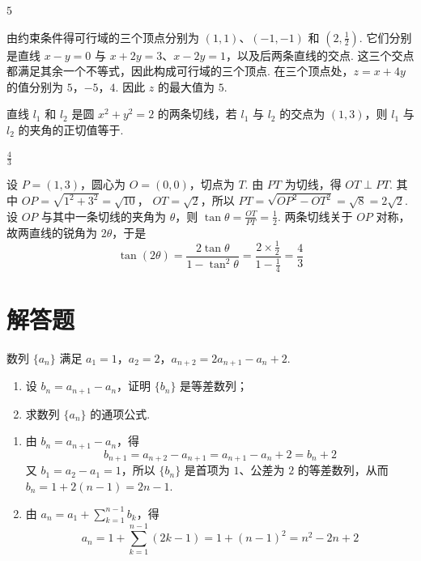 \begin{answer}
\(5\)
\end{answer}

\begin{solution}
由约束条件得可行域的三个顶点分别为 \((1,1)\)、\((-1,-1)\) 和
\(\left(2,\frac{1}{2}\right)\).
它们分别是直线 \(x-y=0\) 与 \(x+2y=3\)、\(x-2y=1\)，以及后两条直线的交点. 这三个交点都满足其余一个不等式，因此构成可行域的三个顶点.
在三个顶点处，\(z=x+4y\) 的值分别为
\(5\)，\(-5\)，\(4\). 因此 \(z\) 的最大值为 \(5\).
\end{solution}

\begin{problem}
直线 \(l_{1}\) 和 \(l_{2}\) 是圆 \(x^{2} + y^{2} = 2\) 的两条切线，若 \(l_{1}\) 与 \(l_{2}\) 的交点为 \((1,3)\)，则 \(l_{1}\) 与 \(l_{2}\) 的夹角的正切值等于\fillinblank{}.
\end{problem}

\begin{answer}
\(\frac{4}{3}\)
\end{answer}

\begin{solution}
设 \(P=(1,3)\)，圆心为 \(O=(0,0)\)，切点为 \(T\). 由 \(PT\) 为切线，得
\(OT\perp PT\). 其中 \(OP=\sqrt{1^2+3^2}=\sqrt{10}\)，
\(OT=\sqrt{2}\)，所以
\(PT=\sqrt{OP^2-OT^2}=\sqrt{8}=2\sqrt{2}\).
设 \(OP\) 与其中一条切线的夹角为 \(\theta\)，则
\(\tan\theta=\frac{OT}{PT}=\frac{1}{2}\). 两条切线关于 \(OP\) 对称，故两直线的锐角为 \(2\theta\)，于是
\[
\tan(2\theta)=\frac{2\tan\theta}{1-\tan^2\theta}
=\frac{2\times\frac12}{1-\frac14}=\frac{4}{3}
\]
\end{solution}

\section{解答题}

\begin{problem}
数列 \( \{a_{n}\} \) 满足 \(a_{1}=1\)，\(a_{2}=2\)，\(a_{n+2}=2a_{n+1}-a_{n}+2\).

\begin{enumerate}
\item 设 \( b_{n} = a_{n+1} - a_{n} \)，证明 \(\{b_{n}\}\) 是等差数列；
\item 求数列 \( \{a_{n}\} \) 的通项公式.
\end{enumerate}
\end{problem}

\begin{solution}
\begin{enumerate}
\item 由 \(b_n=a_{n+1}-a_n\)，得
\[
b_{n+1}=a_{n+2}-a_{n+1}=a_{n+1}-a_n+2=b_n+2
\]
又 \(b_1=a_2-a_1=1\)，所以 \(\{b_n\}\) 是首项为 \(1\)、公差为 \(2\) 的等差数列，从而
\(b_n=1+2(n-1)=2n-1\).
\item 由 \(a_n=a_1+\sum_{k=1}^{n-1}b_k\)，得
\[
a_n=1+\sum_{k=1}^{n-1}(2k-1)=1+(n-1)^2=n^2-2n+2
\]
\end{enumerate}
\end{solution}

